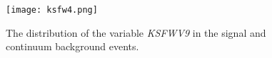 \begin{figure}[htpb]
	\centering
	\texttt{[image: ksfw4.png]}
	\caption{The distribution of the variable \textit{KSFWV9} in the signal and continuum background events.}
	\label{fig:ksfw4}
\end{figure}

